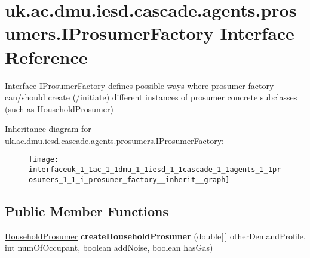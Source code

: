 \hypertarget{interfaceuk_1_1ac_1_1dmu_1_1iesd_1_1cascade_1_1agents_1_1prosumers_1_1_i_prosumer_factory}{\section{uk.\-ac.\-dmu.\-iesd.\-cascade.\-agents.\-prosumers.\-I\-Prosumer\-Factory Interface Reference}
\label{interfaceuk_1_1ac_1_1dmu_1_1iesd_1_1cascade_1_1agents_1_1prosumers_1_1_i_prosumer_factory}
}


Interface \hyperlink{interfaceuk_1_1ac_1_1dmu_1_1iesd_1_1cascade_1_1agents_1_1prosumers_1_1_i_prosumer_factory}{I\-Prosumer\-Factory} defines possible ways where prosumer factory can/should create (/initiate) different instances of prosumer concrete subclasses (such as {\ttfamily \hyperlink{classuk_1_1ac_1_1dmu_1_1iesd_1_1cascade_1_1agents_1_1prosumers_1_1_household_prosumer}{Household\-Prosumer}})  




Inheritance diagram for uk.\-ac.\-dmu.\-iesd.\-cascade.\-agents.\-prosumers.\-I\-Prosumer\-Factory\-:\nopagebreak
\begin{figure}[H]
\begin{center}
\leavevmode
\texttt{[image: interfaceuk\_1\_1ac\_1\_1dmu\_1\_1iesd\_1\_1cascade\_1\_1agents\_1\_1prosumers\_1\_1\_i\_prosumer\_factory\_\_inherit\_\_graph]}
\end{center}
\end{figure}
\subsection*{Public Member Functions}
\begin{DoxyCompactItemize}
\item 
\hypertarget{interfaceuk_1_1ac_1_1dmu_1_1iesd_1_1cascade_1_1agents_1_1prosumers_1_1_i_prosumer_factory_a0d12f02b22282730705a32a7f43962b3}{\hyperlink{classuk_1_1ac_1_1dmu_1_1iesd_1_1cascade_1_1agents_1_1prosumers_1_1_household_prosumer}{Household\-Prosumer} {\bfseries create\-Household\-Prosumer} (double\mbox{[}$\,$\mbox{]} other\-Demand\-Profile, int num\-Of\-Occupant, boolean add\-Noise, boolean has\-Gas)}\label{interfaceuk_1_1ac_1_1dmu_1_1iesd_1_1cascade_1_1agents_1_1prosumers_1_1_i_prosumer_factory_a0d12f02b22282730705a32a7f43962b3}

\end{DoxyCompactItemize}



